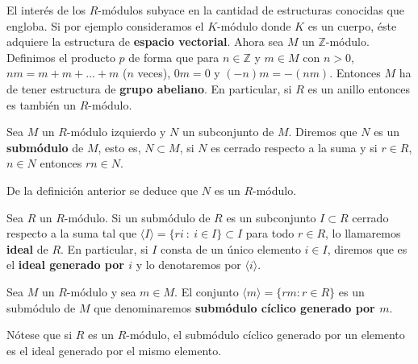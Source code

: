 \begin{ejemplo}
	El interés de los $R$-módulos subyace en la cantidad de estructuras conocidas que
	engloba. Si por ejemplo consideramos el $K$-módulo donde $K$ es un cuerpo, éste
	adquiere la estructura de \textbf{espacio vectorial}. Ahora sea $M$ un $\mathbb{Z}$-módulo.
	Definimos el producto $p$ de forma que para $n \in \mathbb{Z}$ y $m \in M$ con
	$n>0$, $nm = m + m + \ldots + m$ ($n$ veces), $0m=0$ y $(-n)m = -(nm)$. Entonces
	$M$ ha de tener estructura de \textbf{grupo abeliano}. En particular, si $R$
	es un anillo entonces es también un $R$-módulo.
\end{ejemplo}

\begin{definicion}
	Sea $M$ un $R$-módulo izquierdo y $N$ un subconjunto de $M$. Diremos que $N$
	es un \textbf{submódulo} de $M$, esto es, $N \subset M$, si $N$ es cerrado
	respecto a la suma y si $r \in R$, $n \in N$ entonces $rn \in N$.
\end{definicion}
De la definición anterior se deduce que $N$ es un $R$-módulo.
\begin{definicion}
	Sea $R$ un $R$-módulo. Si un submódulo de $R$ es un subconjunto $I \subset R$
	cerrado respecto a la suma tal que
	$\langle I \rangle = \{ri \ : \ i \in I\} \subset I$ para todo $r \in R$, lo llamaremos
	\textbf{ideal} de $R$. En particular, si $I$ consta de un único elemento
	$i \in I$, diremos que es el \textbf{ideal generado por $i$} y lo denotaremos
	por $\langle i \rangle$.
\end{definicion}

\begin{definicion}
	Sea $M$ un $R$-módulo y sea $m \in M$. El conjunto
	$\langle m \rangle = \{r m : r \in R\}$ es un submódulo de $M$ que
	denominaremos \textbf{submódulo cíclico generado por $m$}.
\end{definicion}
\begin{observacion}
	Nótese que si $R$ es un $R$-módulo, el submódulo cíclico generado por un
	elemento es el ideal generado por el mismo elemento.
\end{observacion}

